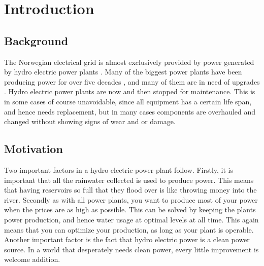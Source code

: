 
\section{Introduction}
    \subsection{Background}
        The Norwegian electrical grid is almost exclusively provided by power generated by hydro electric power plants \cite{Energi212014}. Many of the biggest power plants have been producing power for over five decades \cite{vannkraft}, and many of them are in need of upgrades \cite{tu}. Hydro electric power plants are now and then stopped for maintenance. This is in some cases of course unavoidable, since all equipment has a certain life span, and hence needs replacement, but in many cases components are overhauled and changed without showing signs of wear and or damage. 
        
        
        
        
    \subsection{Motivation}
    
        Two important factors in a hydro electric power-plant follow. Firstly, it is important that all the rainwater collected is used to produce power. This means that having reservoirs so full that they flood over is like throwing money into the river. Secondly as with all power plants, you want to produce most of your power when the prices are as high as possible. This can be solved by keeping the plants power production, and hence water usage at optimal levels at all time. This again means that you can optimize your production, as long as your plant is operable. Another important factor is the fact that hydro electric power is a clean power source. In a world that desperately needs clean power, every little improvement is welcome addition. 
        
        
